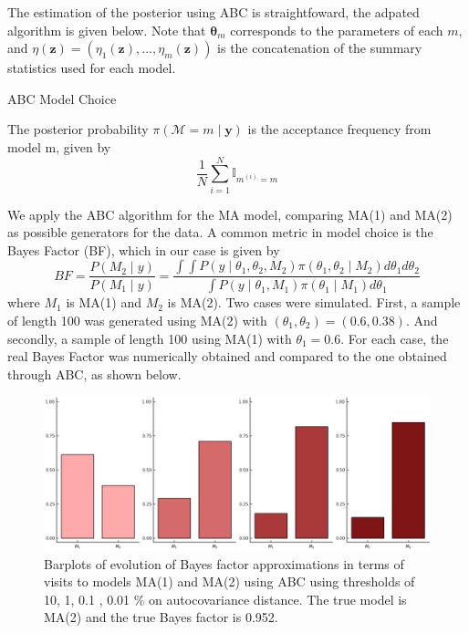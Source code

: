\documentclass[runningheads]{llncs}
\begin{document}
The estimation of the posterior using ABC is straightfoward, the adpated algorithm is given below. Note that
$\bm \theta_m$ corresponds to the parameters of each $m$, and
$\eta(\bm z) = (\eta_1(\bm z),...,\eta_m(\bm z))$ is the concatenation
of the summary statistics used for each model.

\newpage
  \begin{algorithm}[H]
  \SetAlgoLined
   \caption{ABC Model Choice}
  \end{algorithm}
\hfill\break

  The posterior probability $\pi(\mathcal{M}=m \mid \bm y)$
  is the acceptance frequency from model m, given by
  \begin{equation}
  \frac{1}{N}\sum^N_{i=1}\mathbb I_{m^{(i)}=m}
  \end{equation}

We apply the ABC algorithm for the MA model, comparing
MA(1) and MA(2) as possible generators for the data. A common
metric in model choice is the Bayes Factor (BF), which in our
case is given by
\begin{equation}
BF = \frac{P(M_2 \mid y)}{P(M_1 \mid y)}  = 
\frac{\int \int P(y \mid \theta_1, \theta_2, M_2)\pi(\theta_1,\theta_2 \mid M_2)d\theta_1d\theta_2}
{\int P(y \mid \theta_1, M_1)\pi(\theta_1 \mid M_1)d\theta_1}
\end{equation}
where $M_1$ is MA(1) and $M_2$ is MA(2).
Two cases were simulated. First, a sample of length 100 was
generated using MA(2) with $(\theta_1,\theta_2) = (0.6,0.38)$. And
secondly, a sample of length 100 using MA(1) with $\theta_1 = 0.6$.
For each case, the real Bayes Factor was numerically obtained and 
compared to the one obtained through ABC, as shown below.

\hfill\break
    \begin{figure}[H]
        \centering
        \includegraphics[width=12cm]{images/ModelChoice_MA2.png}
        \caption{Barplots of evolution of Bayes factor approximations
        in terms of visits to models MA(1) and MA(2) using
        ABC using thresholds of 10, 1, 0.1 , 0.01 \% on autocovariance
        distance. The true model is MA(2) and the true Bayes factor is 0.952.
        }
    \end{figure}
\end{document}
